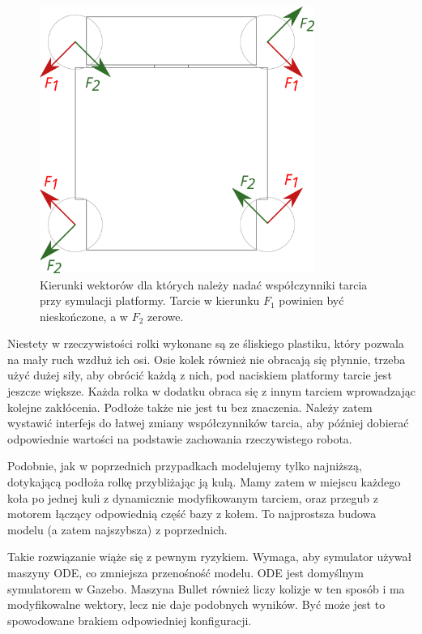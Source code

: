 \begin{figure}[H]
\centering
 \includegraphics[width=0.8\textwidth]{graphics/base_vects.pdf}
\caption{Kierunki wektorów dla których należy nadać współczynniki tarcia przy symulacji platformy. Tarcie w kierunku $F_1$ powinien być nieskończone, a w $F_2$ zerowe.}
\end{figure} 

Niestety w rzeczywistości rolki wykonane są ze śliskiego plastiku, który pozwala na mały ruch wzdłuż ich osi.
Osie kolek również nie obracają się płynnie, trzeba użyć dużej siły, aby obrócić każdą z nich, pod naciskiem platformy tarcie jest jeszcze większe.
Każda rolka w dodatku obraca się z innym tarciem wprowadzając kolejne zakłócenia.
Podłoże także nie jest tu bez znaczenia.
Należy zatem wystawić interfejs do łatwej zmiany współczynników tarcia, aby później dobierać odpowiednie wartości na podstawie zachowania rzeczywistego robota.

Podobnie, jak w poprzednich przypadkach modelujemy tylko najniższą, dotykającą podłoża rolkę przybliżając ją kulą.
Mamy zatem w miejscu każdego koła po jednej kuli z dynamicznie modyfikowanym tarciem, oraz przegub z motorem łączący odpowiednią część bazy z kołem.
To najprostsza budowa modelu (a zatem najszybsza) z poprzednich.

Takie rozwiązanie wiąże się z pewnym ryzykiem.
Wymaga, aby symulator używał maszyny ODE, co zmniejsza przenośność modelu. ODE jest domyślnym symulatorem w Gazebo.
Maszyna Bullet również liczy kolizje w ten sposób i ma modyfikowalne wektory, lecz nie daje podobnych wyników. Być może jest to spowodowane brakiem odpowiedniej konfiguracji.

